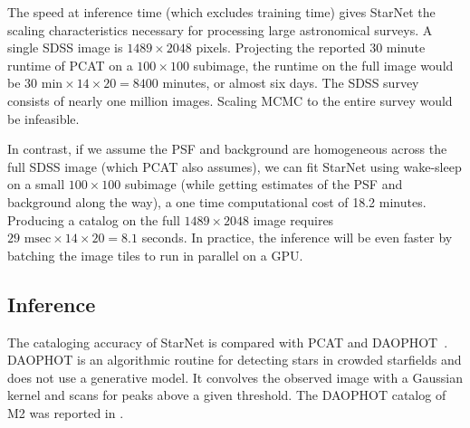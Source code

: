 The speed at inference time (which excludes training time) gives StarNet the scaling characteristics necessary for processing large astronomical surveys. 
A single SDSS image is $1489 \times 2048$ pixels. 
Projecting the reported 30 minute runtime of PCAT on a $100\times100$ subimage, 
the runtime on the full image would be $30\text{ min} \times 14 \times 20 = 8400$ minutes, or almost six days. 
The SDSS survey consists of nearly one million images. Scaling MCMC to the entire survey would be infeasible. 

In contrast, if we assume the PSF and background are homogeneous 
across the full SDSS image (which PCAT also assumes), we can 
fit StarNet using wake-sleep 
on a small $100 \times 100$ subimage
(while getting estimates of the PSF and background along the way),
a one time computational cost of 18.2 minutes. 
Producing a catalog on the full $1489 \times 2048$ image requires
$29\text{ msec} \times 14 \times 20 = 8.1$ seconds. In practice, 
the inference will be even faster by batching the image tiles to run in parallel on a GPU. 



\subsection{Inference}
\label{sec:results_on_m2_inference}
The cataloging accuracy of StarNet is compared with PCAT and DAOPHOT~\cite{stetson2987daophot}. 
DAOPHOT is an algorithmic routine for detecting stars in crowded starfields and does not use a generative model. 
It convolves the observed image with a Gaussian kernel and scans for peaks above a given threshold. 
The DAOPHOT catalog of M2 was reported in 
\cite{An_2008_m2}. 



